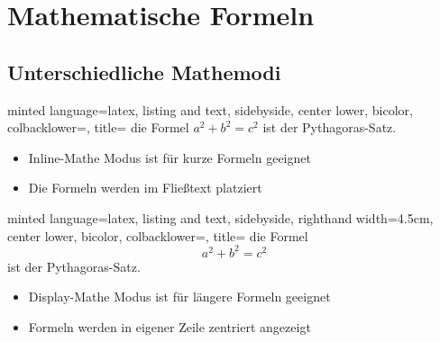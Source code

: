\documentclass[
    ngerman,
    accentcolor=3b,
    dark_mode,
    fontsize= 12pt,
    a4paper,
    aspectratio=169,
    colorback=true,
    fancy_row_colors,
    leqno,
    fleqn,
    boxarc=3pt,
    fleqn,
]{algoslides}
\begin{document}
    \section{Mathematische Formeln}
    \subsection{Unterschiedliche Mathemodi}
    \begin{frame}[c, fragile]
        \slidehead{}
        \begin{codeBlock}[]{
            minted language=latex,
            listing and text,
            sidebyside,
            center lower,
            bicolor,
            colbacklower=,
            title=
            }
            die Formel $a^2+b^2=c^2$ ist der Pythagoras-Satz.
        \end{codeBlock}
        \begin{itemize}
            \item Inline-Mathe Modus ist für kurze Formeln geeignet
            \item Die Formeln werden im Fließtext platziert
        \end{itemize}
    \end{frame}

    \begin{frame}[c, fragile]
        \slidehead{}
        \begin{codeBlock}[]{
            minted language=latex,
            listing and text,
            sidebyside,
            righthand width=4.5cm,
            center lower,
            bicolor,
            colbacklower=,
            title=
            }
            die Formel $$a^2+b^2=c^2$$ ist der Pythagoras-Satz.
        \end{codeBlock}
        \begin{itemize}
            \item Display-Mathe Modus ist für längere Formeln geeignet
            \item Formeln werden in eigener Zeile zentriert angezeigt
        \end{itemize}
    \end{frame}
\end{document}
